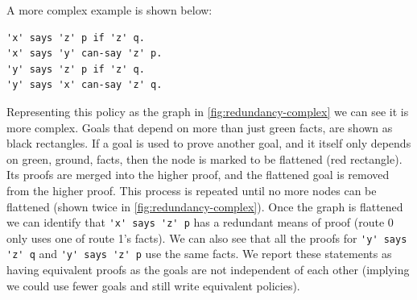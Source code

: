 \documentclass[thesis.tex]{subfiles}
\begin{document}
A more complex example is shown below:

\begin{lstlisting}
'x' says 'z' p if 'z' q.
'x' says 'y' can-say 'z' p.
'y' says 'z' p if 'z' q.
'y' says 'x' can-say 'z' q.
\end{lstlisting}

Representing this policy as the graph in \autoref{fig:redundancy-complex} we can see it is more complex. Goals that
depend on more than just green facts, are shown as black rectangles.  If a goal
is used to prove another goal, and it itself only depends on green, ground,
facts, then the node is marked to be flattened (red rectangle).  Its proofs are
merged into the higher proof, and the flattened goal is removed from the higher
proof.  This process is repeated until no more nodes can be flattened (shown
twice in \autoref{fig:redundancy-complex}).  Once the graph is flattened we can
identify that \lstinline!'x' says 'z' p! has a redundant means of proof (route
0 only uses one of route 1's facts).  We can also see that all the proofs for
\lstinline!'y' says 'z' q! and \lstinline!'y' says 'z' p! use the same facts.
We report these statements as having equivalent proofs as the goals are not
independent of each other (implying we could use fewer goals and still write
equivalent policies).
\end{document}
